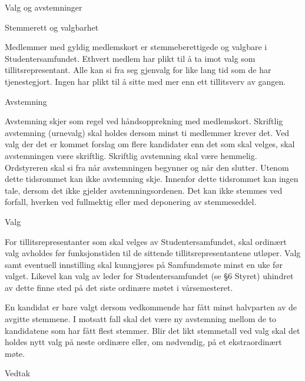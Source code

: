 \documentclass[fsbok.tex]{subfiles}
\begin{document}
\begin{lovkapittel}{Valg og avstemninger}
  
  \begin{lovparagraf}{Stemmerett og valgbarhet}

Medlemmer med gyldig medlemskort er stemmeberettigede og valgbare i Studentersamfundet. Ethvert medlem har
plikt til å ta imot valg som tillitsrepresentant. Alle kan si fra seg gjenvalg for like lang tid som de har tjenestegjort.
Ingen har plikt til å sitte med mer enn ett tillitsverv av gangen.

  \end{lovparagraf}
  
  \begin{lovparagraf}{Avstemning}
  
Avstemning skjer som regel ved håndsopprekning med medlemskort. Skriftlig avstemning (urnevalg) skal holdes
dersom minst ti medlemmer krever det. Ved valg der det er kommet forslag om flere kandidater enn det som skal
velges, skal avstemningen være skriftlig. Skriftlig avstemning skal være hemmelig. Ordstyreren skal si fra når
avstemningen begynner og når den slutter. Utenom dette tidsrommet kan ikke avstemning skje. Innenfor dette
tidsrommet kan ingen tale, dersom det ikke gjelder avstemningsordenen. Det kan ikke stemmes ved forfall, hverken
ved fullmektig eller med deponering av stemmeseddel.
  
  \end{lovparagraf}
  
  \begin{lovparagraf}{Valg}

For tillitsrepresentanter som skal velges av Studentersamfundet, skal ordinært valg avholdes før funksjonstiden til de
sittende tillitsrepresentantene utløper. Valg samt eventuell innstilling skal kunngjøres på Samfundsmøte minst en uke
før valget. Likevel kan valg av leder for Studentersamfundet (se §6 Styret) uhindret av dette finne sted på det siste
ordinære møtet i vårsemesteret.

En kandidat er bare valgt dersom vedkommende har fått minst halvparten av de avgitte stemmene. I motsatt fall skal
det være ny avstemning mellom de to kandidatene som har fått flest stemmer. Blir det likt stemmetall ved valg skal
det holdes nytt valg på neste ordinære eller, om nødvendig, på et ekstraordinært møte.
  
  \end{lovparagraf}
  
  \begin{lovparagraf}{Vedtak}
  

\end{lovparagraf}
\end{lovkapittel}
\end{document}

